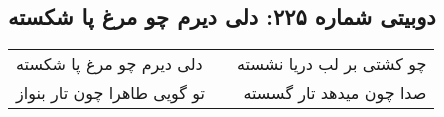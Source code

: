 \begin{center}
\section*{دوبیتی شماره ۲۲۵: دلی دیرم چو مرغ پا شکسته}
\label{sec:225}
\begin{longtable}{l p{0.5cm} r}
دلی دیرم چو مرغ پا شکسته
&&
چو کشتی بر لب دریا نشسته
\\
تو گویی طاهرا چون تار بنواز
&&
صدا چون میدهد تار گسسته
\\
\end{longtable}
\end{center}
